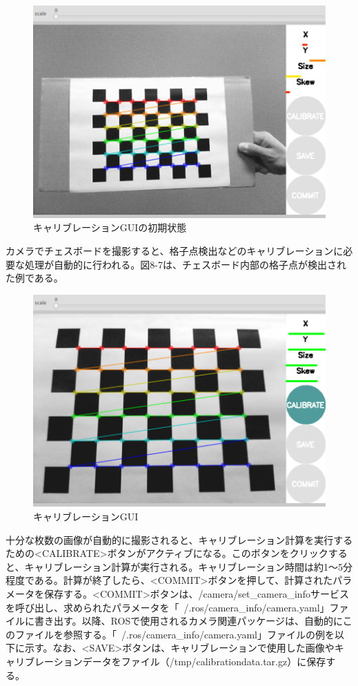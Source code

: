\begin{figure}[htp]
  \centering
  \includegraphics[width=12cm]{pictures/chapter8/pic_08_06.png}
  \caption{キャリブレーションGUIの初期状態}
\end{figure}

カメラでチェスボードを撮影すると、格子点検出などのキャリブレーションに必要な処理が自動的に行われる。図8-7は、チェスボード内部の格子点が検出された例である。

\begin{figure}[htp]
  \centering
  \includegraphics[width=12cm]{pictures/chapter8/pic_08_07.png}
  \caption{キャリブレーションGUI}
\end{figure}

十分な枚数の画像が自動的に撮影されると、キャリブレーション計算を実行するための<CALIBRATE>ボタンがアクティブになる。このボタンをクリックすると、キャリブレーション計算が実行される。キャリブレーション時間は約1〜5分程度である。計算が終了したら、<COMMIT>ボタンを押して、計算されたパラメータを保存する。<COMMIT>ボタンは、/camera/set\_camera\_infoサービスを呼び出し、求められたパラメータを「~/.ros/camera\_info/camera.yaml」ファイルに書き出す。以降、ROSで使用されるカメラ関連パッケージは、自動的にこのファイルを参照する。「~/.ros/camera\_info/camera.yaml」ファイルの例を以下に示す。なお、<SAVE>ボタンは、キャリブレーションで使用した画像やキャリブレーションデータをファイル（/tmp/calibrationdata.tar.gz）に保存する。

